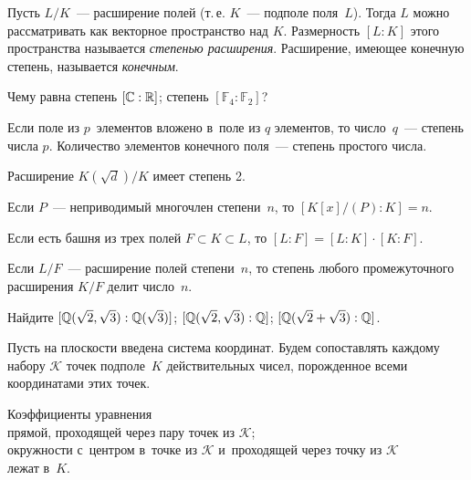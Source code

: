 \documentclass[a4paper, 12pt]{article}
\begin{document}


Пусть $L/K$~--- расширение полей (т.\,е. $K$~--- подполе поля~$L$). Тогда $L$ можно рассматривать как векторное пространство над $K$. Размерность $[L:K]$ этого пространства называется \emph{степенью расширения}.
%
Расширение, имеющее конечную степень, называется \emph{конечным}.




%
Чему равна  степень $[\mathbb{C}:\mathbb{R}]$;  степень $[\mathbb F_4:\mathbb F_2]$?






 Если поле из $p$~элементов вложено в~поле из $q$ элементов, то число~$q$~--- степень числа $p$.
\quad
{} Количество элементов конечного поля~--- степень простого числа.






 Расширение $K(\sqrt d)/K$ имеет степень 2.

 Если $P$~--- неприводимый многочлен степени~$n$, то $[K[x]/(P):K]=n$.






 Если есть башня из трех полей $F\subset K\subset L$, то $[L:F]=[L:K]\cdot [K:F]$.

 Если $L/F$~--- расширение полей степени~$n$, то степень любого промежуточного расширения $K/F$ делит число~$n$.






Найдите\quad
{} $[\mathbb{Q}(\sqrt2,\sqrt3):\mathbb{Q}(\sqrt3)]$;\quad
{} $[\mathbb{Q}(\sqrt2,\sqrt3):\mathbb{Q}]$;\quad
{} $[\mathbb{Q}(\sqrt2+\sqrt3):\mathbb{Q}]$.






%
Пусть на плоскости введена система координат. Будем сопоставлять каждому набору $\mathcal K$ точек подполе~$K$ действительных чисел, порожденное всеми координатами этих точек.




Коэффициенты уравнения\\
 прямой, проходящей через пару точек из $\mathcal K$;\\
 окружности с~центром в~точке из $\mathcal K$ и~проходящей через точку из $\mathcal K$\\
лежат в~$K$.
\end{document}
